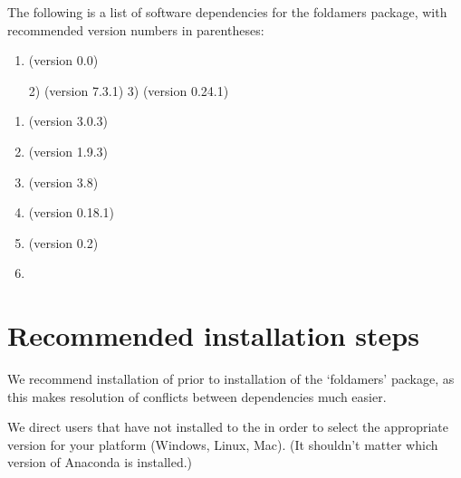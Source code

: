 \documentclass[letterpaper,12pt,english,openany,oneside]{sphinxmanual}
\begin{document}
The following is a list of software dependencies for the foldamers package, with recommended version numbers in parentheses:
\begin{enumerate}
\def\theenumi{\arabic{enumi}}
\def\labelenumi{\theenumi )}
\makeatletter\def\p@enumii{\p@enumi \theenumi )}\makeatother
\item {} 
 (version 0.0)

2)  (version 7.3.1)
3)  (version 0.24.1)

\end{enumerate}
\begin{enumerate}
\def\theenumi{\arabic{enumi}}
\def\labelenumi{\theenumi )}
\makeatletter\def\p@enumii{\p@enumi \theenumi )}\makeatother
\setcounter{enumi}{3}
\item {} 
 (version 3.0.3)

\item {} 
 (version 1.9.3)

\item {} 
 (version 3.8)

\item {} 
 (version 0.18.1)

\item {} 
 (version 0.2)

\item {} 

\end{enumerate}


\section{Recommended installation steps}
\label{\detokenize{install:recommended-installation-steps}}
We recommend installation of  prior to installation of the ‘foldamers’ package, as this makes resolution of conflicts between dependencies much easier.

We direct users that have not installed  to the  in order to select the appropriate version for your platform (Windows, Linux, Mac).  (It shouldn’t matter which version of Anaconda is installed.)
\end{document}
